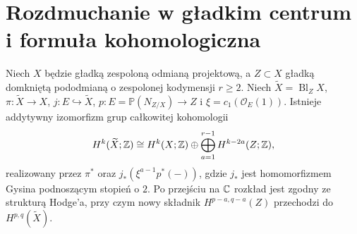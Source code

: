 \section{Rozdmuchanie w gładkim centrum i formuła kohomologiczna}
\begin{twierdzenie}
\label{thm:xvii-blowup-general}
Niech $X$ będzie gładką zespoloną odmianą projektową,
a $Z\subset X$ gładką domkniętą pododmianą o zespolonej
kodymensji $r\ge2$. Niech $\widetilde X=\operatorname{Bl}_Z X$,
$\pi:\widetilde X\to X$, $j:E\hookrightarrow\widetilde X$,
$p:E=\mathbb P(N_{Z/X})\to Z$ i
$\xi=c_1(\mathcal O_E(1))$.
Istnieje addytywny izomorfizm grup całkowitej kohomologii
\[
H^k(\widetilde X;\mathbb{Z})\cong H^k(X;\mathbb{Z})\oplus
\bigoplus_{a=1}^{r-1}H^{k-2a}(Z;\mathbb{Z}),
\]
realizowany przez $\pi^*$ oraz $j_*(\xi^{a-1}p^*(-))$,
gdzie $j_*$ jest homomorfizmem Gysina podnoszącym stopień o $2$.
Po przejściu na $\mathbb{C}$ rozkład jest zgodny ze strukturą Hodge'a,
przy czym nowy składnik $H^{p-a,q-a}(Z)$ przechodzi do
$H^{p,q}(\widetilde X)$.
\end{twierdzenie}
